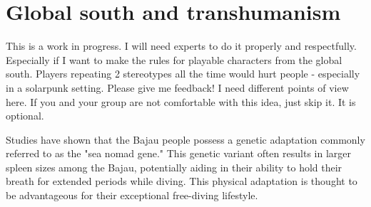 




\section{Global south and transhumanism}
\label{sec:Transhumanism}
\label{sec:Global South}

\begin{warning}
    This is a work in progress. I will need experts to do it properly and respectfully. Especially if I want to make the rules for playable characters from the global south. Players repeating 2 stereotypes all the time would hurt people - especially in a solarpunk setting.
    Please give me feedback! I need different points of view here.
    If you and your group are not comfortable with this idea, just skip it. It is optional.
\end{warning}


Studies have shown that the Bajau people possess a genetic adaptation commonly referred to as the "sea nomad gene." This genetic variant often results in larger spleen sizes among the Bajau, potentially aiding in their ability to hold their breath for extended periods while diving. This physical adaptation is thought to be advantageous for their exceptional free-diving lifestyle.

